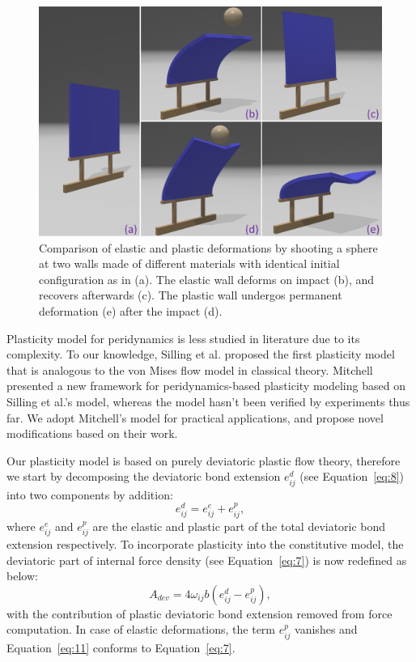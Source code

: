 \begin{figure}[t]
  \centering
  \includegraphics[width=\linewidth]{../figs/demo_impact_upside.png}
  \caption{\label{fig:4}
  Comparison of elastic and plastic deformations by shooting a sphere at two walls made of different materials with identical initial configuration as in (a). The elastic wall deforms on impact (b), and recovers afterwards (c). The plastic wall undergos permanent deformation (e) after the impact (d).
}
\end{figure}
Plasticity model for peridynamics is less studied in literature due to its complexity. To our knowledge, Silling et al. \cite{silling2007peridynamic} proposed the first plasticity model that is analogous to the von Mises flow model in classical theory. Mitchell presented a new framework for peridynamics-based plasticity modeling\cite{mitchell2011nonlocal} based on Silling et al.'s model, whereas the model hasn't been verified by experiments thus far. We adopt Mitchell's model for practical applications, and propose novel modifications based on their work.

Our plasticity model is based on purely deviatoric plastic flow theory, therefore we start by decomposing the deviatoric bond extension $e_{ij}^d$ (see Equation~\ref{eq:8}) into two components by addition:
\begin{equation}
e_{ij}^d = e_{ij}^e+e_{ij}^p,
\label{eq:10}
\end{equation}
where $e_{ij}^e$ and $e_{ij}^p$ are the elastic and plastic part of the total deviatoric bond extension respectively. To incorporate plasticity into the constitutive model,  the deviatoric part of internal force density (see Equation~\ref{eq:7}) is now redefined as below:
\begin{equation}
A_{dev} = 4\omega_{ij}b(e_{ij}^d-e_{ij}^p),
\label{eq:11}
\end{equation}
with the contribution of plastic deviatoric bond extension removed from force computation. In case of elastic deformations, the term $e_{ij}^p$ vanishes and Equation~\ref{eq:11} conforms to Equation~\ref{eq:7}.

